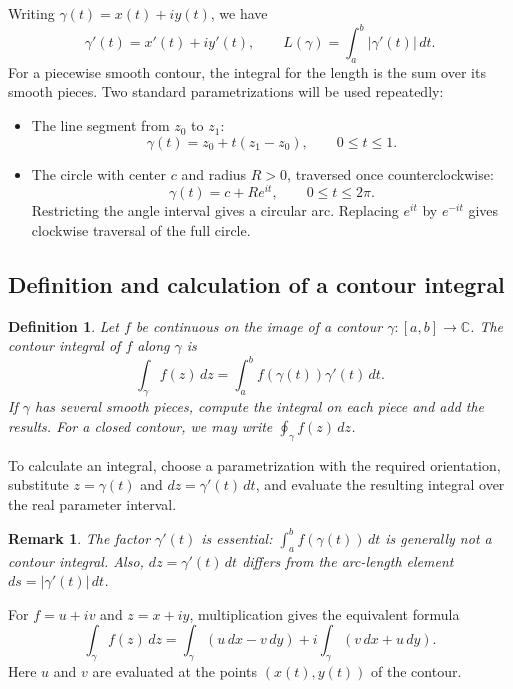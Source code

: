 \documentclass{report}
\newtheorem{definition}{Definition}
\newtheorem{remark}{Remark}
\begin{document}
Writing $\gamma(t)=x(t)+iy(t)$, we have
\[
    \gamma'(t)=x'(t)+iy'(t),\qquad
    L(\gamma)=\int_a^b|\gamma'(t)|\,dt.
\]
For a piecewise smooth contour, the integral for the length is the sum over
its smooth pieces. Two standard parametrizations will be used repeatedly:
\begin{itemize}
    \item The line segment from $z_0$ to $z_1$:
    \[
        \gamma(t)=z_0+t(z_1-z_0),\qquad 0\leq t\leq1.
    \]
    \item The circle with center $c$ and radius $R>0$, traversed once
    counterclockwise:
    \[
        \gamma(t)=c+Re^{it},\qquad 0\leq t\leq2\pi.
    \]
    Restricting the angle interval gives a circular arc. Replacing $e^{it}$
    by $e^{-it}$ gives clockwise traversal of the full circle.
\end{itemize}

\subsection{Definition and calculation of a contour integral}

\begin{definition}
    Let $f$ be continuous on the image of a contour $\gamma:[a,b]\to\mathbb C$.
    The \emph{contour integral} of $f$ along $\gamma$ is
    \[
        \boxed{\displaystyle
        \int_\gamma f(z)\,dz
        =\int_a^b f(\gamma(t))\gamma'(t)\,dt.}
    \]
    If $\gamma$ has several smooth pieces, compute the integral on each
    piece and add the results. For a closed contour, we may write
    $\displaystyle\oint_\gamma f(z)\,dz$.
\end{definition}

To calculate an integral, choose a parametrization with the required
orientation, substitute $z=\gamma(t)$ and $dz=\gamma'(t)\,dt$, and evaluate
the resulting integral over the real parameter interval.

\begin{remark}
    The factor $\gamma'(t)$ is essential:
    $\int_a^b f(\gamma(t))\,dt$ is generally not a contour integral.
    Also, $dz=\gamma'(t)\,dt$ differs from the arc-length element
    $ds=|\gamma'(t)|\,dt$.
\end{remark}

For $f=u+iv$ and $z=x+iy$, multiplication gives the equivalent formula
\[
    \int_\gamma f(z)\,dz
    =\int_\gamma (u\,dx-v\,dy)
     +i\int_\gamma (v\,dx+u\,dy).
\]
Here $u$ and $v$ are evaluated at the points $(x(t),y(t))$ of the contour.
\end{document}

